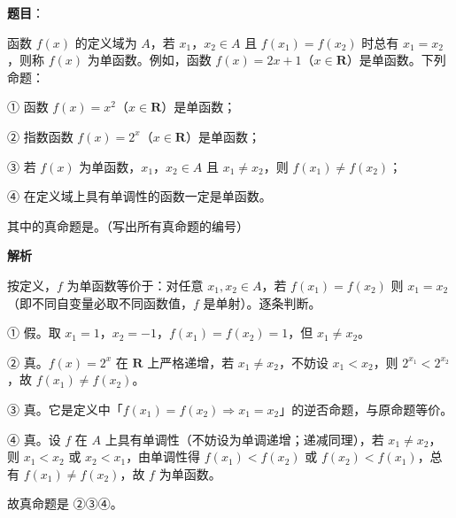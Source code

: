 \begin{answer}

\textbf{题目}：

函数 $f(x)$ 的定义域为 $A$，若 $x_1$，$x_2\in A$ 且 $f(x_1)=f(x_2)$ 时总有 $x_1=x_2$，则称 $f(x)$ 为单函数。例如，函数 $f(x)=2x+1$（$x\in\mathbf R$）是单函数。下列命题：

① 函数 $f(x)=x^2$（$x\in\mathbf R$）是单函数；

② 指数函数 $f(x)=2^x$（$x\in\mathbf R$）是单函数；

③ 若 $f(x)$ 为单函数，$x_1$，$x_2\in A$ 且 $x_1\neq x_2$，则 $f(x_1)\neq f(x_2)$；

④ 在定义域上具有单调性的函数一定是单函数。

其中的真命题是\gkblank{}。（写出所有真命题的编号）

\textbf{解析}

按定义，$f$ 为单函数等价于：对任意 $x_1,x_2\in A$，若 $f(x_1)=f(x_2)$ 则 $x_1=x_2$（即不同自变量必取不同函数值，$f$ 是单射）。逐条判断。

① 假。取 $x_1=1$，$x_2=-1$，$f(x_1)=f(x_2)=1$，但 $x_1\neq x_2$。

② 真。$f(x)=2^x$ 在 $\mathbf R$ 上严格递增，若 $x_1\neq x_2$，不妨设 $x_1<x_2$，则 $2^{x_1}<2^{x_2}$，故 $f(x_1)\neq f(x_2)$。

③ 真。它是定义中「$f(x_1)=f(x_2)\Rightarrow x_1=x_2$」的逆否命题，与原命题等价。

④ 真。设 $f$ 在 $A$ 上具有单调性（不妨设为单调递增；递减同理），若 $x_1\neq x_2$，则 $x_1<x_2$ 或 $x_2<x_1$，由单调性得 $f(x_1)<f(x_2)$ 或 $f(x_2)<f(x_1)$，总有 $f(x_1)\neq f(x_2)$，故 $f$ 为单函数。

故真命题是 ②③④。


\end{answer}
